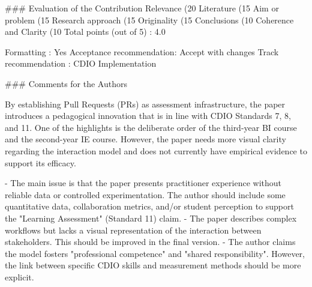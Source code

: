 ### Evaluation of the Contribution
Relevance (20%
Literature (15%
Aim or problem (15%
Research approach (15%
Originality (15%
Conclusions (10%
Coherence and Clarity (10%
Total points (out of 5) : 4.0

Formatting               : Yes  
Acceptance recommendation: Accept with changes  
Track recommendation     : CDIO Implementation  


### Comments for the Authors

By establishing Pull Requests (PRs) as assessment infrastructure, the paper introduces a pedagogical innovation that is in line with CDIO Standards 7, 8, and 11. One of the highlights is the deliberate order of the third-year BI course and the second-year IE course. However, the paper needs more visual clarity regarding the interaction model and does not currently have empirical evidence to support its efficacy.

- The main issue is that the paper presents practitioner experience without reliable data or controlled experimentation. The author should include some quantitative data, collaboration metrics, and/or student perception to support the "Learning Assessment" (Standard 11) claim.  
- The paper describes complex workflows but lacks a visual representation of the interaction between stakeholders. This should be improved in the final version.  
- The author claims the model fosters "professional competence" and "shared responsibility". However, the link between specific CDIO skills and measurement methods should be more explicit.